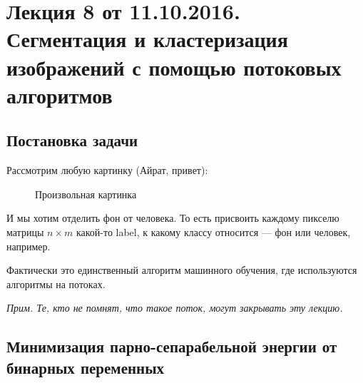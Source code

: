 
% 

\section{Лекция 8 от 11.10.2016. Сегментация и кластеризация изображений
с помощью потоковых алгоритмов}

\subsection{Постановка задачи}

Рассмотрим любую картинку (Айрат, привет):

\begin{figure}[H]
  \caption{Произвольная картинка}
\end{figure}

И мы хотим отделить фон от человека. То есть присвоить каждому пикселю матрицы
$n \times m$ какой-то label, к какому классу относится --- фон или человек,
например.

Фактически это единственный алгоритм машинного обучения, где используются
алгоритмы на потоках.

\textit{Прим. Те, кто не помнят, что такое поток, могут закрывать эту лекцию.}

\subsection{Минимизация парно-сепарабельной энергии от бинарных переменных}

